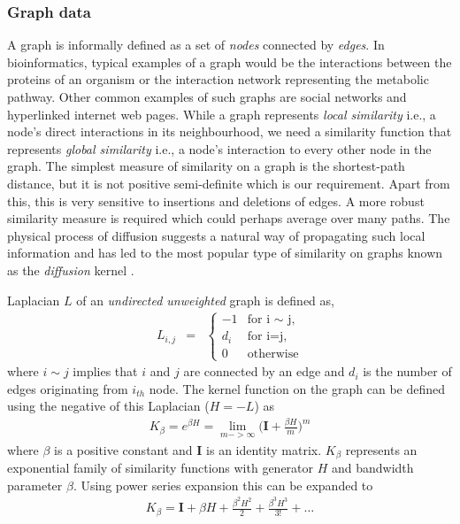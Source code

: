 \subsubsection{Graph data}
A graph is informally defined as a set of \textit{nodes} connected by \textit{edges}. In bioinformatics, typical examples of a graph would be the interactions between the proteins of an organism or the interaction network representing the metabolic pathway. Other common examples of such graphs are social networks and hyperlinked internet web pages. While a graph represents \textit{local similarity} i.e., a node's direct interactions in its neighbourhood, we need a similarity function that represents \textit{global similarity} i.e., a node's interaction to every other node in the graph. The simplest measure of similarity on a graph is the shortest-path distance, but it is not positive semi-definite which is our requirement. Apart from this, this is very sensitive to insertions and deletions of edges. A more robust similarity measure is required which could perhaps average over many paths. The physical process of diffusion suggests a natural way of propagating such local information and has led to the most popular type of similarity on graphs known as the \textit{diffusion} kernel \citep{Kondor02diffusion}.

Laplacian $L$ of an \textit{undirected unweighted} graph is defined as,
\begin{eqnarray}
L_{i,j} &=& \begin{cases}
             -1 & \text{for i $\sim$ j,} \\
	     d_{i} & \text{for i=j,} \\
	     0 & \text{otherwise}
            \end{cases}
\end{eqnarray}
where $i \sim j$ implies that $i$ and $j$ are connected by an edge and $d_{i}$ is the number of edges originating from $i_{th}$ node. The kernel function on the graph can be defined using the negative of this Laplacian ($H=-L$) as
\begin{eqnarray}
K_{\beta} = e^{\beta H}= \lim_{m->\infty}\big ( \mathbf{I}+\frac{\beta H}{m}\big )^m
\end{eqnarray}
where $\beta$ is a positive constant and $\mathbf{I}$ is an identity matrix. $K_{\beta}$ represents an exponential family of similarity functions with generator $H$ and bandwidth parameter $\beta$. Using power series expansion this can be expanded to
\begin{eqnarray}
K_{\beta}=  \mathbf{I}+ \beta H +\frac{\beta ^2 H^2}{2} +\frac{\beta ^3 H^3}{3!} + \dots \label{diffusion}
\end{eqnarray}

